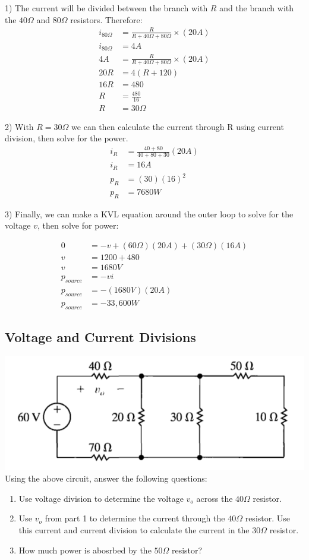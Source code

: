 1) The current will be divided between the branch with $R$ and the branch with the $40\Omega$ and
$80\Omega$ resistors. Therefore:
\begin{align*}
	i_{80\Omega} &= \frac{R}{R+40\Omega+80\Omega} \times (20A) \\
	i_{80\Omega} &= 4 A \\
	4 A &= \frac{R}{R+40\Omega+80\Omega} \times (20A) \\
	20R &= 4(R+120) \\
	16R &= 480 \\
	R &= \frac{480}{16} \\
	R &= 30\Omega
\end{align*}

2) With $R = 30\Omega$ we can then calculate the current through R using current division, then
solve for the power. 
\begin{align*}
	i_R &= \frac{40+80}{40+80+30}(20 A) \\
	i_R &= 16 A \\
	p_R &= (30)(16)^2 \\
	p_R &= 7680 W
\end{align*}

3) Finally, we can make a KVL equation around the outer loop to solve for the voltage $v$, then solve for power:

\begin{align*}
	0 &= -v + (60 \Omega)(20 A) + (30 \Omega)(16 A) \\
	v &= 1200 + 480 \\
	v &= 1680 V \\
	p_{source} &= -vi \\
	p_{source} &= -(1680 V)(20 A) \\
	p_{source} &= -33,600 W
\end{align*}




\subsection{Voltage and Current Divisions}
\includegraphics[scale=0.5]{img/c3/p3}
\\Using the above circuit, answer the following questions:
\begin{enumerate}
	\item Use voltage division to determine the voltage $v_o$ across the $40 \Omega$ resistor.
	\item Use $v_o$ from part 1 to determine the current through the $40 \Omega$ resistor. Use
	this current and current division to calculate the current in the $30 \Omega$ resistor.
	\item How much power is abosrbed by the $50 \Omega$ resistor?
\end{enumerate}

